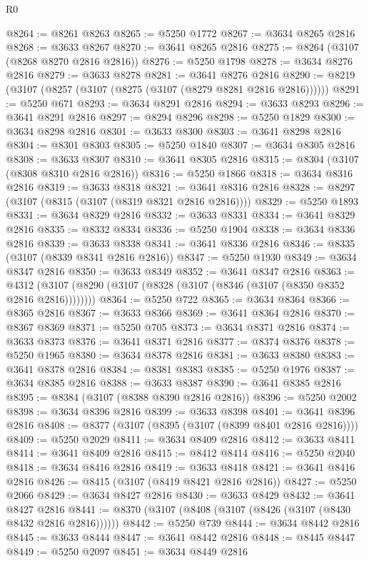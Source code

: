 \begin{lexlean}{R0}
\begin{coremodule}
@8264 := @8261 @8263
@8265 := @5250 @1772
@8267 := @3634 @8265 @2816
@8268 := @3633 @8267
@8270 := @3641 @8265 @2816
@8275 := @8264 (@3107 (@8268 @8270 @2816 @2816))
@8276 := @5250 @1798
@8278 := @3634 @8276 @2816
@8279 := @3633 @8278
@8281 := @3641 @8276 @2816
@8290 := @8219 (@3107 (@8257 (@3107 (@8275 (@3107 (@8279 @8281 @2816 @2816))))))
@8291 := @5250 @671
@8293 := @3634 @8291 @2816
@8294 := @3633 @8293
@8296 := @3641 @8291 @2816
@8297 := @8294 @8296
@8298 := @5250 @1829
@8300 := @3634 @8298 @2816
@8301 := @3633 @8300
@8303 := @3641 @8298 @2816
@8304 := @8301 @8303
@8305 := @5250 @1840
@8307 := @3634 @8305 @2816
@8308 := @3633 @8307
@8310 := @3641 @8305 @2816
@8315 := @8304 (@3107 (@8308 @8310 @2816 @2816))
@8316 := @5250 @1866
@8318 := @3634 @8316 @2816
@8319 := @3633 @8318
@8321 := @3641 @8316 @2816
@8328 := @8297 (@3107 (@8315 (@3107 (@8319 @8321 @2816 @2816))))
@8329 := @5250 @1893
@8331 := @3634 @8329 @2816
@8332 := @3633 @8331
@8334 := @3641 @8329 @2816
@8335 := @8332 @8334
@8336 := @5250 @1904
@8338 := @3634 @8336 @2816
@8339 := @3633 @8338
@8341 := @3641 @8336 @2816
@8346 := @8335 (@3107 (@8339 @8341 @2816 @2816))
@8347 := @5250 @1930
@8349 := @3634 @8347 @2816
@8350 := @3633 @8349
@8352 := @3641 @8347 @2816
@8363 := @4312 (@3107 (@8290 (@3107 (@8328 (@3107 (@8346 (@3107 (@8350 @8352 @2816 @2816))))))))
@8364 := @5250 @722
@8365 := @3634 @8364
@8366 := @8365 @2816
@8367 := @3633 @8366
@8369 := @3641 @8364 @2816
@8370 := @8367 @8369
@8371 := @5250 @705
@8373 := @3634 @8371 @2816
@8374 := @3633 @8373
@8376 := @3641 @8371 @2816
@8377 := @8374 @8376
@8378 := @5250 @1965
@8380 := @3634 @8378 @2816
@8381 := @3633 @8380
@8383 := @3641 @8378 @2816
@8384 := @8381 @8383
@8385 := @5250 @1976
@8387 := @3634 @8385 @2816
@8388 := @3633 @8387
@8390 := @3641 @8385 @2816
@8395 := @8384 (@3107 (@8388 @8390 @2816 @2816))
@8396 := @5250 @2002
@8398 := @3634 @8396 @2816
@8399 := @3633 @8398
@8401 := @3641 @8396 @2816
@8408 := @8377 (@3107 (@8395 (@3107 (@8399 @8401 @2816 @2816))))
@8409 := @5250 @2029
@8411 := @3634 @8409 @2816
@8412 := @3633 @8411
@8414 := @3641 @8409 @2816
@8415 := @8412 @8414
@8416 := @5250 @2040
@8418 := @3634 @8416 @2816
@8419 := @3633 @8418
@8421 := @3641 @8416 @2816
@8426 := @8415 (@3107 (@8419 @8421 @2816 @2816))
@8427 := @5250 @2066
@8429 := @3634 @8427 @2816
@8430 := @3633 @8429
@8432 := @3641 @8427 @2816
@8441 := @8370 (@3107 (@8408 (@3107 (@8426 (@3107 (@8430 @8432 @2816 @2816))))))
@8442 := @5250 @739
@8444 := @3634 @8442 @2816
@8445 := @3633 @8444
@8447 := @3641 @8442 @2816
@8448 := @8445 @8447
@8449 := @5250 @2097
@8451 := @3634 @8449 @2816

\end{coremodule}
\end{lexlean}
